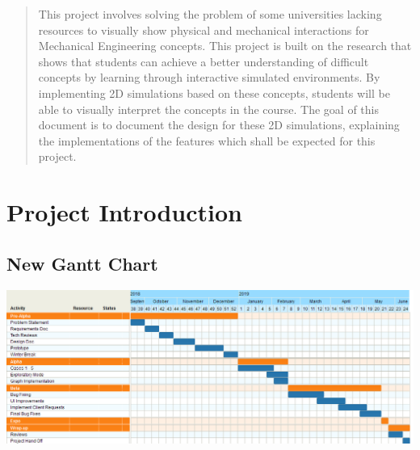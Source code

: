 \documentclass[onecolumn, draftclsnofoot,10pt, compsoc]{IEEEtran}
\begin{document}
\begin{titlepage}
\begin{singlespace}
\begin{abstract}
This project involves solving the problem of some universities lacking resources to visually show physical and mechanical interactions for Mechanical Engineering concepts.
This project is built on the research that shows that students can achieve a better understanding of difficult concepts by learning through interactive simulated environments.
By implementing 2D simulations based on these concepts, students will be able to visually interpret the concepts in the course.
The goal of this document is to document the design for these 2D simulations, explaining the implementations of the features which shall be expected for this project.
        \end{abstract}     
    \end{singlespace}
\end{titlepage}

\tableofcontents
{}



\newpage
\section{Project Introduction}  


%  



\subsection{New Gantt Chart}
\includegraphics[width=\textwidth]{NewGantt.png}
% 
\end{document}
